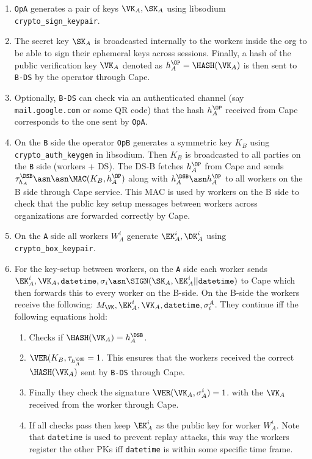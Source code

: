 \begin{enumerate}
  \item \verb|OpA| generates a pair of keys $\VK_A, \SK_A$
  using libsodium \verb|crypto_sign_keypair|.
  \item The secret key $\SK_A$ is broadcasted internally to the workers
  inside the org to be able to sign their ephemeral keys across sessions.
  Finally, a hash of the public verification key $\VK_A$
  denoted as $h_A^\OP = \HASH(\VK_A)$
  is then sent to \verb|B-DS| by the operator through Cape.
  \item Optionally, \verb|B-DS| can check via an authenticated channel (say \verb|mail.google.com|
  or some QR code) that the hash $h_A^\OP$ received from Cape corresponds to the one sent by \verb|OpA|.

  \item On the \verb|B| side the operator \verb|OpB| generates a symmetric key $K_B$
  using \verb|crypto_auth_keygen| in libsodium.
  Then $K_B$ is broadcasted to all parties on the \verb|B| side (workers +
  DS). The DS-B fetches $h_A^\OP$ from Cape and sends $\tau_{h_A}^\DSB \asn \asn
  \MAC(K_B, h_A^\OP)$ along with $h_A^\DSB \asn h_A^\OP$ to all workers on the B side
  through Cape service. This MAC is used by workers on the B side to check
  that the public key setup messages between workers across organizations are
  forwarded correctly by Cape.

  \item On the \verb|A| side all workers $W_A^i$ generate $\EK_A^i, \DK_A^i$
  using \verb|crypto_box_keypair|.

  \item For the key-setup between workers, on the \verb|A| side each worker
  sends $\EK_A^i, \VK_A, \verb|datetime|, \sigma_i \asn \SIGN(\SK_A, \EK_A^i
  || \verb|datetime|)$ to Cape which then forwards this to every worker on
  the B-side. On the B-side the workers receive the following: $M_\VK,
  \EK_A^i, \VK_A, \verb|datetime|, \sigma^A_i$.
  They continue iff the following equations hold:

  \begin{enumerate}
    \item Checks if $\HASH(\VK_A) = h_A^\DSB$.
    \item $\VER(K_B, \tau_{h_A^\DSB} = 1$. This ensures that the workers
    received the correct $\HASH(\VK_A)$ sent by \verb|B-DS| through Cape.

    \item Finally they check the signature $\VER(\VK_A, \sigma^i_A) = 1$.
    with the $\VK_A$ received from the worker through Cape.
    \item If all checks pass then keep $\EK_A^i$ as the public key for worker $W_A^i$.
    Note that \verb|datetime| is used to prevent replay attacks, this way the workers
    register the other PKs iff \verb|datetime| is within some specific time frame.
  \end{enumerate}


\end{enumerate}
